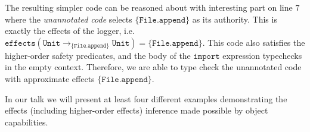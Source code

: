 \documentclass[sigplan,10pt,review]{acmart}\settopmatter{printfolios=true,printccs=false,printacmref=false}
\newcommand{\Unit}{\kwa{Unit}}
\newcommand{\File}{\kwa{File}}
\newcommand{\kwa}[1]{\mathtt{#1}}
\newcommand{\fx}[1]{\kwa{effects}(#1)}
\begin{document}
The resulting simpler code can be reasoned about with interesting part on line $7$ where the \textit{unannotated code} selects $\{ \kwa{File.append} \}$ as its authority. This is exactly the effects of the logger, i.e. $\kwa{effects}(\Unit \rightarrow_{\{\kwa{File.append}\}} \Unit) = \{ \kwa{File.append} \}$. This code also satisfies the higher-order safety predicates, and the body of the $\kwa{import}$ expression typechecks in the empty context. Therefore, we are able to type check the unannotated code with approximate effects $\kwa{\{ \kwa{File.append} \}}$.

In our talk we will present at least four different examples demonstrating the effects (including higher-order effects) inference made possible by object capabilities.

%
%
%
%
%
%
%
%
%
\end{document}
